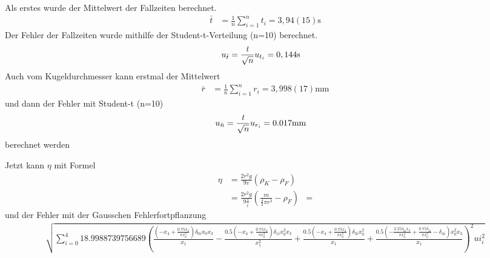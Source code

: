 \documentclass[11pt, a4paper]{article}
\begin{document}
    Als erstes wurde der Mittelwert der Fallzeiten berechnet.
    \begin{align}
        \bar{t} &= \frac{1}{n} \sum_{i=1}^{n} t_i = 3,94(15) \si{\second}
    \end{align}
    Der Fehler der Fallzeiten wurde mithilfe der Student-t-Verteilung (n=10) berechnet.
    \begin{align}
        u_{\bar{t}} &= \frac{{\it t}}{\sqrt{n}} u_{t_i} =  0,144 \si{\second}
    \end{align}
    Auch vom Kugeldurchmesser kann erstmal der Mittelwert
    \begin{align}
        \bar{r} &= \frac{1}{n} \sum_{i=1}^{n} r_i = 3,998(17) \si{\milli\metre}
    \end{align}
    und dann der Fehler mit Student-t (n=10)
    \begin{align}
        u_{\bar{n}} &= \frac{{\it t}}{\sqrt{n}} u_{r_i} = 0.017 \si{\milli\metre}
    \end{align}
    berechnet werden

    Jetzt kann $\eta$ mit Formel \cite[(11)]{VIS}
    \begin{align}
        \eta &= \frac{2r^2g}{9v}(\rho_K - \rho_F) \\
        &= \frac{2r^2g}{9\frac{s}{\bar{t}}}(\frac{m}{\frac{4}{3} \pi r^3} - \rho_F)
        &= 
    \end{align}
    und der Fehler mit der Gausschen Fehlerfortpflanzung \cite{ABW}
    \begin{multline}
        \sqrt{\sum_{i=0}^{4} 18.9988739756689 \left(\frac{\left(- {x}_{4} + \frac{0.75 {x}_{2}}{\pi {x}_{0}^{3}}\right) \delta_{0 i} {x}_{0} {x}_{3}}{{x}_{1}} - \frac{0.5 \left(- {x}_{4} + \frac{0.75 {x}_{2}}{\pi {x}_{0}^{3}}\right) \delta_{1 i} {x}_{0}^{2} {x}_{3}}{{x}_{1}^{2}} + \frac{0.5 \left(- {x}_{4} + \frac{0.75 {x}_{2}}{\pi {x}_{0}^{3}}\right) \delta_{3 i} {x}_{0}^{2}}{{x}_{1}} + \frac{0.5 \left(- \frac{2.25 \delta_{0 i} {x}_{2}}{\pi {x}_{0}^{4}} + \frac{0.75 \delta_{2 i}}{\pi {x}_{0}^{3}} - \delta_{4 i}\right) {x}_{0}^{2} {x}_{3}}{{x}_{1}}\right)^{2} {ui}_{i}^{2}}
    \end{multline}


    
    
\end{document}
